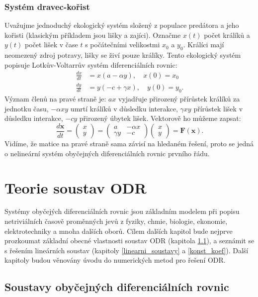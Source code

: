 \documentclass[a4paper, 12pt]{book}
\theoremstyle{definition}
\def\vc#1{\mathbf{\boldsymbol{#1}}}     %
\begin{document}
\subsection{Systém dravec-kořist}
Uvažujme jednoduchý ekologický systém složený z populace predátora  a jeho kořisti (klasickým příkladem jsou lišky a zajíci).
Označme $x(t)$ počet králíků a $y(t)$ počet lišek v čase $t$ s počátečními velikostmi $x_0$ a $y_0$. 
Králíci mají neomezený zdroj potravy, lišky se živí pouze králíky.
Tento ekologický systém popisuje Lotkův-Voltarrův systém diferenciálních rovnic:
\begin{align}
  \frac{d x}{dt} &= x(a-\alpha y), \quad x(0)=x_0\\
  \frac{d y}{dt} &= y(-c+\gamma x), \quad y(0)=y_0.
\end{align}
Význam členů na pravé straně je: $ax$ vyjadřuje přirozený přírůstek králíků za jednotku času, $-\alpha xy$ umrtí králíků v důsledku interakce,
$\gamma x y$ přírůstek lišek v důsledku interakce, $-cy$ přirozený úbytek lišek.
Vektorově ho můžeme zapsat:
\[
   \frac{d \vc x}{dt} = \begin{pmatrix} x\\ y \end{pmatrix}
   = \begin{pmatrix} a & -\alpha x \\ \gamma y & - c\end{pmatrix} 
     \begin{pmatrix} x \\ y\end{pmatrix} = \vc F(\vc x).
\]
Vidíme, že matice na pravé straně sama závisí na hledaném řešení, proto se jedná o nelineární systém obyčejných diferenciálních rovnic prvního řádu.



\chapter{Teorie soustav ODR}
Systémy obyčejých diferenciálních rovnic jsou základním modelem při popisu netriviálních 
časově proměnných jevů z fyziky, chmie, biologie, ekonomie, elektrotechniky a mnoha dalších oborů. 
Cílem dalších kapitol bude nejprve prozkoumat základní obecné vlastnosti soustav ODR (kapitola \ref{soustavy}),
a seznámit se s řešením lineárních soustav (kapitoly \ref{linearni_soustavy} a \ref{konst_koef}). Další kapitoly budou věnovány 
úvodu do numerických metod pro řešení ODR.

\section{Soustavy obyčejných diferenciálních rovnic}
\label{soustavy}
\end{document}

